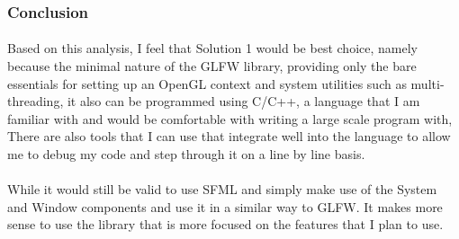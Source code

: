 \subsubsection{Conclusion}
\paragraph{}
Based on this analysis, I feel that Solution 1 would be best choice, namely because the minimal nature of the GLFW library, providing only the bare essentials for setting up an OpenGL context and system utilities such as multi-threading, it also can be programmed using C/C++, a language that I am familiar with and would be comfortable with writing a large scale program with, There are also tools that I can use that integrate well into the language to allow me to debug my code and step through it on a line by line basis.

\paragraph{}
While it would still be valid to use SFML and simply make use of the System and Window components and use it in a similar way to GLFW. It makes more sense to use the library that is more focused on the features that I plan to use.